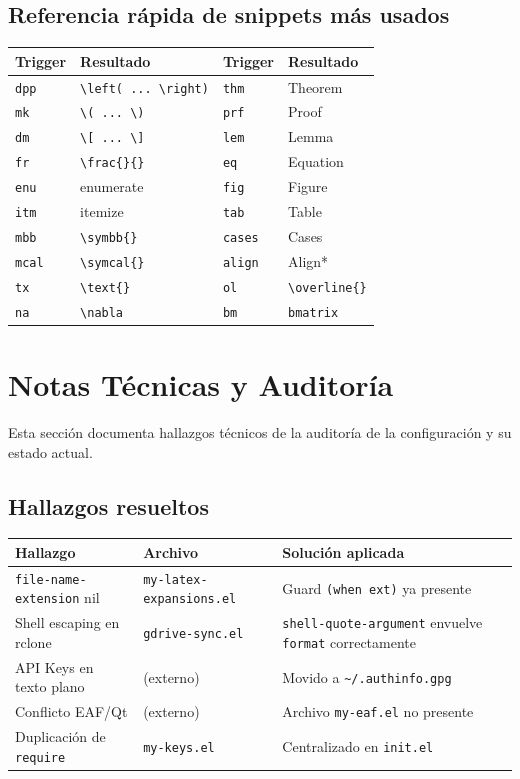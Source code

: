 \documentclass[11pt]{article}
\begin{document}
\subsection{Referencia rápida de snippets más usados}
\label{sec:org74bc5b1}
\begin{center}
\begin{tabular}{llll}
Trigger & Resultado & Trigger & Resultado\\
\hline
\texttt{dpp} & \texttt{\textbackslash{}left( ... \textbackslash{}right)} & \texttt{thm} & Theorem\\
\texttt{mk} & \texttt{\textbackslash{}( ... \textbackslash{})} & \texttt{prf} & Proof\\
\texttt{dm} & \texttt{\textbackslash{}[ ... \textbackslash{}]} & \texttt{lem} & Lemma\\
\texttt{fr} & \texttt{\textbackslash{}frac\{\}\{\}} & \texttt{eq} & Equation\\
\texttt{enu} & enumerate & \texttt{fig} & Figure\\
\texttt{itm} & itemize & \texttt{tab} & Table\\
\texttt{mbb} & \texttt{\textbackslash{}symbb\{\}} & \texttt{cases} & Cases\\
\texttt{mcal} & \texttt{\textbackslash{}symcal\{\}} & \texttt{align} & Align*\\
\texttt{tx} & \texttt{\textbackslash{}text\{\}} & \texttt{ol} & \texttt{\textbackslash{}overline\{\}}\\
\texttt{na} & \texttt{\textbackslash{}nabla} & \texttt{bm} & \texttt{bmatrix}\\
\end{tabular}
\end{center}
\section{Notas Técnicas y Auditoría}
\label{sec:org7263afb}

Esta sección documenta hallazgos técnicos de la auditoría de la configuración y su estado actual.
\subsection{Hallazgos resueltos}
\label{sec:org823deb3}

\begin{center}
\begin{tabular}{lll}
Hallazgo & Archivo & Solución aplicada\\
\hline
\texttt{file-name-extension} nil & \texttt{my-latex-expansions.el} & Guard \texttt{(when ext)} ya presente\\
Shell escaping en rclone & \texttt{gdrive-sync.el} & \texttt{shell-quote-argument} envuelve \texttt{format} correctamente\\
API Keys en texto plano & (externo) & Movido a \texttt{\textasciitilde{}/.authinfo.gpg}\\
Conflicto EAF/Qt & (externo) & Archivo \texttt{my-eaf.el} no presente\\
Duplicación de \texttt{require} & \texttt{my-keys.el} & Centralizado en \texttt{init.el}\\
\end{tabular}
\end{center}
\end{document}
